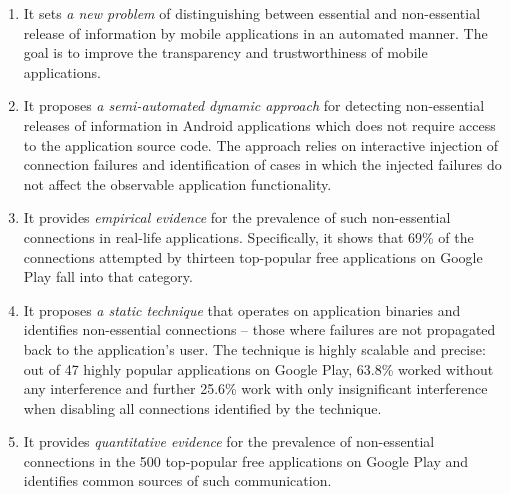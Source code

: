 \vspace{-0.05in}
\begin{enumerate}[leftmargin=0.5cm]\setlength{\itemsep}{-0.01in}

\item It sets \emph{a new problem} of distinguishing between essential and non-essential release of information by mobile applications in an automated manner. The goal is to improve the
transparency and trustworthiness of mobile applications.

\item It proposes \emph{a semi-automated dynamic approach} for detecting non-essential releases of information in Android applications which does not require access to the application source code. 
The approach relies on interactive injection of connection failures and identification of cases in which the injected failures do not affect the observable application functionality. 

\item It provides \emph{empirical evidence} for the prevalence of such non-essential connections in real-life applications. Specifically, it shows that 69\% of the connections attempted by thirteen top-popular free applications on Google Play fall into that category.    

\item It proposes \emph{a static technique} that operates on application binaries and identifies non-essential connections -- those where failures are not propagated back to the application's user. The technique is highly scalable and precise: out of 47 highly popular applications on Google Play, 
63.8\% worked without any interference and further 25.6\% work with only insignificant interference when 
disabling all connections identified by the technique.


\item It provides \emph{quantitative evidence} for the prevalence of non-essential connections in the 500 top-popular free applications on Google Play and identifies common sources of such communication. 


\end{enumerate}




